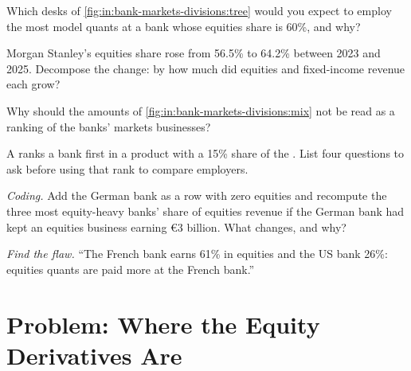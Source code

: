 \begin{exercise}[$\star$]\label{exo:in:bank-markets-divisions:3}
Which desks of \cref{fig:in:bank-markets-divisions:tree} would you expect to employ the most model quants at a bank
whose equities share is 60\%, and why?
\end{exercise}

\begin{exercise}[$\star\star$]\label{exo:in:bank-markets-divisions:4}
Morgan Stanley's equities share rose from 56.5\% to 64.2\% between 2023 and 2025. Decompose the change: by how much did
equities and fixed-income revenue each grow?
\end{exercise}

\begin{exercise}[$\star\star$]\label{exo:in:bank-markets-divisions:5}
Why should the amounts of \cref{fig:in:bank-markets-divisions:mix} not be read as a ranking of the banks' markets
businesses?
\end{exercise}

\begin{exercise}[$\star\star$]\label{exo:in:bank-markets-divisions:6}
A  ranks a bank first in a product with a 15\% share of the . List four questions to ask before
using that rank to compare employers.
\end{exercise}

\begin{exercise}[$\star\star\star$]\label{exo:in:bank-markets-divisions:7}
\emph{Coding.} Add the German bank as a row with zero equities and recompute the three most equity-heavy banks' share of
equities revenue if the German bank had kept an equities business earning \euro3 billion. What changes, and why?
\end{exercise}

\begin{exercise}[$\star\star\star$]\label{exo:in:bank-markets-divisions:8}
\emph{Find the flaw.} ``The French bank earns 61\% in equities and the US bank 26\%: equities quants are paid more at the
French bank.''
\end{exercise}

\section{Problem: Where the Equity Derivatives Are}

